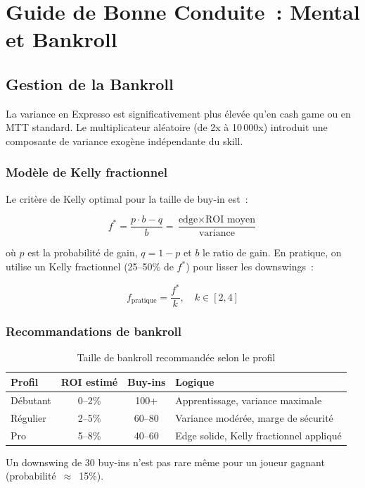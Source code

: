 \documentclass[a4paper,11pt]{article}
\begin{document}
\newpage
\section{Guide de Bonne Conduite~: Mental et Bankroll}

\subsection{Gestion de la Bankroll}

La variance en Expresso est significativement plus \'elev\'ee qu'en cash game ou en MTT standard. Le multiplicateur al\'eatoire (de 2x \`a 10\,000x) introduit une composante de variance exog\`ene ind\'ependante du skill.

\subsubsection{Mod\`ele de Kelly fractionnel}

Le crit\`ere de Kelly optimal pour la taille de buy-in est~:

\begin{equation}
f^* = \frac{p \cdot b - q}{b} = \frac{\text{edge} \times \text{ROI moyen}}{\text{variance}}
\end{equation}

o\`u $p$ est la probabilit\'e de gain, $q = 1 - p$ et $b$ le ratio de gain. En pratique, on utilise un Kelly fractionnel (25--50\% de $f^*$) pour lisser les downswings~:

\begin{equation}
f_{\text{pratique}} = \frac{f^*}{k}, \quad k \in [2, 4]
\end{equation}

\subsubsection{Recommandations de bankroll}

\begin{table}[H]
\centering
\caption{Taille de bankroll recommand\'ee selon le profil}
\label{tab:bankroll}
\begin{tabular}{l c c l}
\toprule
\textbf{Profil} & \textbf{ROI estim\'e} & \textbf{Buy-ins} & \textbf{Logique} \\
\midrule
D\'ebutant & 0--2\% & 100+ & Apprentissage, variance maximale \\
R\'egulier & 2--5\% & 60--80 & Variance mod\'er\'ee, marge de s\'ecurit\'e \\
Pro & 5--8\% & 40--60 & Edge solide, Kelly fractionnel appliqu\'e \\
\bottomrule
\end{tabular}

\medskip
\footnotesize
Un downswing de 30 buy-ins n'est pas rare m\^eme pour un joueur gagnant (probabilit\'e~$\approx$~15\%).
\end{table}
\end{document}

